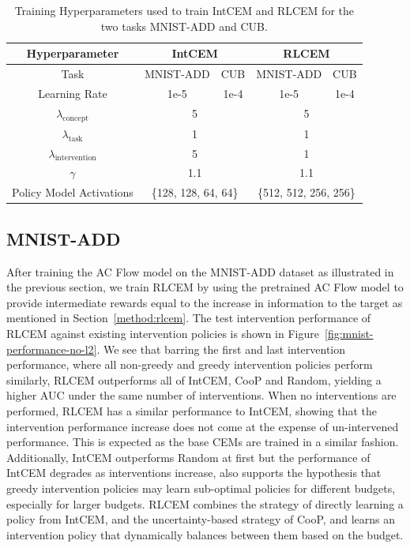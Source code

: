 \begin{table}[!ht]
    \centering
    \renewcommand{\arraystretch}{1.5}
    \begin{tabular}{c|cccc}
        Hyperparameter & \multicolumn{2}{c}{IntCEM} & \multicolumn{2}{c}{RLCEM} \\
        \hline
        Task & MNIST-ADD & CUB &
        MNIST-ADD & CUB \\ 
        Learning Rate & 1e-5 & 1e-4 & 1e-5 & 1e-4 \\
        \hline
        $\lambda_{\text{concept}}$ & \multicolumn{2}{c}{5} & \multicolumn{2}{c}{5}\\
        $\lambda_{\text{task}}$ & \multicolumn{2}{c}{1} & \multicolumn{2}{c}{1}\\
        $\lambda_{\text{intervention}}$ & \multicolumn{2}{c}{5} & \multicolumn{2}{c}{1}\\
        $\gamma$ & \multicolumn{2}{c}{1.1} & \multicolumn{2}{c}{1.1} \\
        Policy Model Activations & \multicolumn{2}{c}{\{128, 128, 64, 64\}}
        &  \multicolumn{2}{c}{\{512, 512, 256, 256\}} \\
    \end{tabular}
    \caption{Training Hyperparameters used to train IntCEM and RLCEM for the 
    two tasks MNIST-ADD and CUB. }
    \label{table:hyperparameters}
\end{table}

\subsection{MNIST-ADD}

After training the AC Flow model on the MNIST-ADD dataset 
as illustrated in the previous section, we train RLCEM by 
using the
pretrained AC Flow model to provide intermediate rewards equal to 
the increase in information to the target as mentioned in 
Section~\ref{method:rlcem}.
The test intervention performance of RLCEM against 
existing intervention policies is shown in
Figure~\ref{fig:mnist-performance-no-l2}.
We see that barring the first and last intervention performance,
where all non-greedy and greedy intervention policies perform similarly,
RLCEM outperforms all of IntCEM, CooP and Random, yielding a 
higher AUC under the same number of interventions.
When no interventions are performed, 
RLCEM has a similar performance to 
IntCEM, showing that the intervention performance
increase does not come at the expense of un-intervened performance.
This is expected as the base CEMs are trained 
in a similar fashion. Additionally, IntCEM outperforms Random
 at first but the performance of 
IntCEM degrades as interventions increase,
also supports the hypothesis that greedy intervention policies 
may learn
sub-optimal policies for different budgets, especially for larger
 budgets.
RLCEM combines the strategy of directly learning a policy from IntCEM,
and the uncertainty-based strategy of CooP, and learns an intervention policy
that dynamically balances between them based on the budget.

